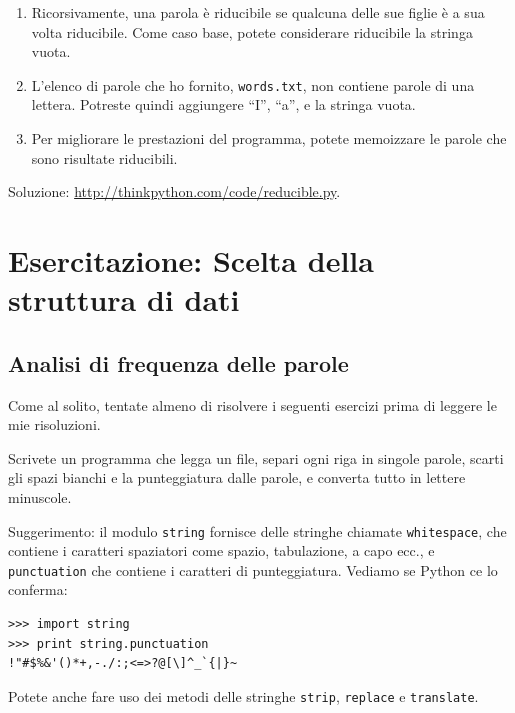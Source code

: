 \documentclass[10pt]{book}
\begin{document}
\begin{exercise}
\begin{enumerate}
\item Ricorsivamente, una parola è riducibile se qualcuna delle sue figlie è a sua volta riducibile. Come caso base, potete considerare riducibile la stringa vuota.

\item L'elenco di parole che ho fornito, {\tt words.txt}, non contiene parole di una lettera. Potreste quindi aggiungere ``I'', ``a'', e la stringa vuota.

\item Per migliorare le prestazioni del programma, potete memoizzare le parole che sono risultate riducibili.

\end{enumerate}

Soluzione: \url{http://thinkpython.com/code/reducible.py}.

\end{exercise}








\chapter{Esercitazione: Scelta della struttura di dati}

\section{Analisi di frequenza delle parole}
\label{analysis}

Come al solito, tentate almeno di risolvere i seguenti esercizi prima di leggere le mie risoluzioni.

\vspace{0.2in}
\begin{exercise}

Scrivete un programma che legga un file, separi ogni riga in singole parole, scarti gli spazi bianchi e la punteggiatura dalle parole, e converta tutto in lettere minuscole.

Suggerimento: il modulo {\tt string} fornisce delle stringhe chiamate {\tt whitespace}, che contiene i caratteri spaziatori come spazio, tabulazione, a capo ecc., e {\tt punctuation} che contiene i caratteri di punteggiatura. Vediamo se Python ce lo conferma:

\begin{verbatim}
>>> import string
>>> print string.punctuation
!"#$%&'()*+,-./:;<=>?@[\]^_`{|}~
\end{verbatim}
%
Potete anche fare uso dei metodi delle stringhe {\tt strip},
{\tt replace} e {\tt translate}.

\end{exercise}
\end{document}
